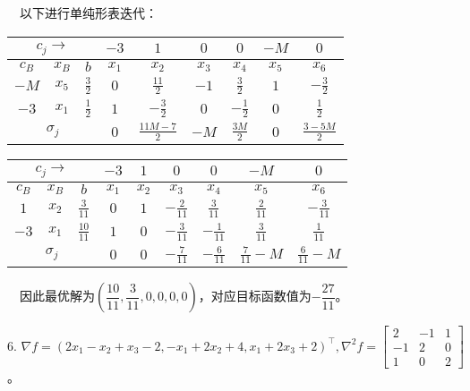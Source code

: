 \documentclass[cn,hazy,green,11pt,normal]{elegantnote}
\begin{document}
    $\quad$以下进行单纯形表迭代：

    \begin{table}[H]
        \centering
        \begin{tabular}{|c|c|c|c|c|c|c|c|c|}
            \hline
            \multicolumn{3}{|c|}{$c_j\rightarrow$} & $-3$ & $1$ & $0$ & $0$ & $-M$ & $0$ \\
            \hline
            $c_B$ & $x_B$ & $b$ & $x_1$ & $x_2$ & $x_3$ & $x_4$ & $x_5$ & $x_6$ \\
            \hline
            $-M$& $x_5$ & $\tfrac32$ & $0$ & $\tfrac{11}2$ & $-1$ & $\tfrac32$ & $1$ & $-\tfrac32$\\
            \hline
            $-3$& $x_1$ & $\tfrac12$ & $1$ & $-\tfrac32$ & $0$ & $-\tfrac12$ & $0$ & $\tfrac12$\\
            \hline
            \multicolumn{3}{|c|}{$\sigma_j$} & $0$ & $\tfrac{11M-7}2$ & $-M$ & $\tfrac{3M}2$ & $0$ & $\tfrac{3-5M}2$\\
            \hline
        \end{tabular}
    \end{table}

    \begin{table}[H]
        \centering
        \begin{tabular}{|c|c|c|c|c|c|c|c|c|}
            \hline
            \multicolumn{3}{|c|}{$c_j\rightarrow$} & $-3$ & $1$ & $0$ & $0$ & $-M$ & $0$ \\
            \hline
            $c_B$ & $x_B$ & $b$ & $x_1$ & $x_2$ & $x_3$ & $x_4$ & $x_5$ & $x_6$ \\
            \hline
            $1$& $x_2$ & $\tfrac3{11}$ & $0$ & $1$ & $-\tfrac2{11}$ & $\tfrac3{11}$ & $\tfrac2{11}$ & $-\tfrac3{11}$\\
            \hline
            $-3$& $x_1$ & $\tfrac{10}{11}$ & $1$ & $0$ & $-\tfrac3{11}$ & $-\tfrac1{11}$ & $\tfrac3{11}$ & $\tfrac1{11}$\\
            \hline
            \multicolumn{3}{|c|}{$\sigma_j$} & $0$ & $0$ & $-\tfrac7{11}$ & $-\tfrac6{11}$ & $\tfrac7{11}-M$ & $\tfrac6{11}-M$ \\
            \hline
        \end{tabular}
    \end{table}

    $\quad$因此最优解为$\left(\dfrac{10}{11},\dfrac{3}{11},0,0,0,0\right)$，对应目标函数值为$-\dfrac{27}{11}$。

    $6.\,\,\nabla f=(2x_1-x_2+x_3-2,-x_1+2x_2+4,x_1+2x_3+2)^{\top},\nabla^2 f=\begin{bmatrix}2&-1&1\\-1&2&0\\1&0&2\end{bmatrix}$。
\end{document}
